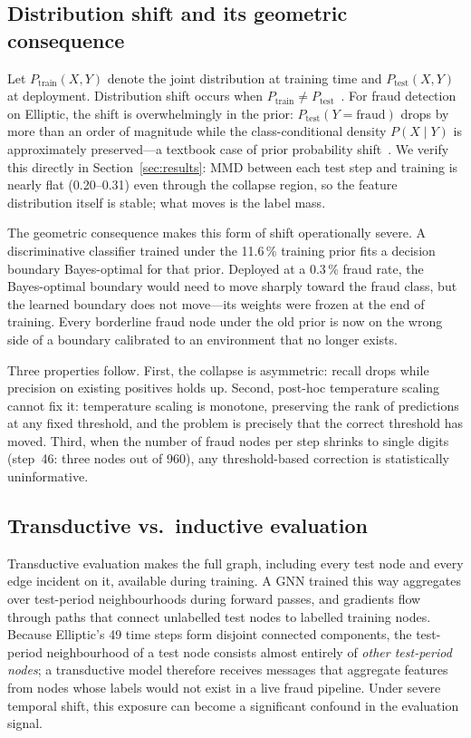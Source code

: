 \subsection{Distribution shift and its geometric consequence}

Let $P_{\text{train}}(X, Y)$ denote the joint distribution at training
time and $P_{\text{test}}(X, Y)$ at deployment.  Distribution shift occurs when $P_{\text{train}} \neq
P_{\text{test}}$~\citep{ben2010theory,sugiyama2007covariate}.  For
fraud detection on Elliptic, the shift is overwhelmingly in the prior:
$P_{\text{test}}(Y{=}\text{fraud})$ drops by more than an order of
magnitude while the class-conditional density $P(X \mid Y)$ is
approximately preserved---a textbook case of prior probability
shift~\citep{quinonero2009shift}.  We verify this directly in
Section~\ref{sec:results}: MMD between each test step and training is
nearly flat (0.20--0.31) even through the collapse region, so the
feature distribution itself is stable; what moves is the label mass.

The geometric consequence makes this form of shift operationally
severe.  A discriminative classifier trained under the
11.6\,\% training prior fits a decision boundary Bayes-optimal for that
prior.  Deployed at a 0.3\,\% fraud rate, the Bayes-optimal boundary
would need to move sharply toward the fraud class, but the learned
boundary does not move---its weights were frozen at the end of training.
Every borderline fraud node under the old prior is now on the wrong
side of a boundary calibrated to an environment that no longer exists.

Three properties follow.  First, the collapse is asymmetric: recall
drops while precision on existing positives holds up.  Second, post-hoc
temperature scaling~\citep{guo2017calibration} cannot fix it: temperature
scaling is monotone, preserving the rank of predictions at any fixed
threshold, and the problem is precisely that the correct threshold has
moved.  Third, when the number of fraud nodes per step shrinks to single
digits (step~46: three nodes out of 960), any threshold-based correction
is statistically uninformative.

\subsection{Transductive vs.\ inductive evaluation}
\label{sec:transductive}

Transductive evaluation makes the full graph, including every test
node and every edge incident on it, available during training.  A GNN
trained this way aggregates over test-period neighbourhoods during
forward passes, and gradients flow through paths that connect
unlabelled test nodes to labelled training nodes.  Because Elliptic's
49 time steps form disjoint connected components, the test-period
neighbourhood of a test node consists almost entirely of \emph{other
test-period nodes}; a transductive model therefore receives messages
that aggregate features from nodes whose labels would not exist in a
live fraud pipeline.  Under severe temporal shift, this exposure can become a significant
confound in the evaluation signal.

